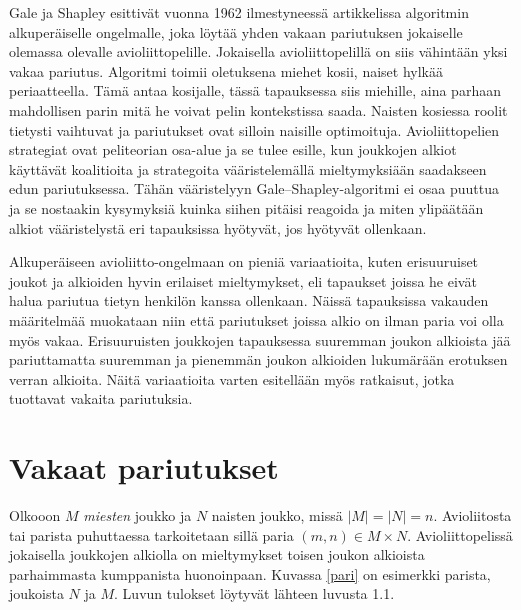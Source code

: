\documentclass[finnish]{tktltiki2}
\theoremstyle{definition}
\theoremstyle{remark}
\begin{document}
Gale ja Shapley esittivät vuonna 1962 ilmestyneessä artikkelissa \cite{gale62a} algoritmin alkuperäiselle ongelmalle, joka löytää yhden vakaan pariutuksen jokaiselle olemassa olevalle avioliittopelille. Jokaisella avioliittopelillä on siis vähintään yksi vakaa pariutus. Algoritmi toimii oletuksena miehet kosii, naiset hylkää periaatteella. Tämä antaa kosijalle, tässä tapauksessa siis miehille, aina parhaan mahdollisen parin mitä he voivat pelin kontekstissa saada. Naisten kosiessa roolit tietysti vaihtuvat ja pariutukset ovat silloin naisille optimoituja.
Avioliittopelien strategiat ovat peliteorian osa-alue ja se tulee esille, kun joukkojen alkiot käyttävät koalitioita ja strategoita vääristelemällä mieltymyksiään saadakseen edun pariutuksessa. Tähän vääristelyyn Gale--Shapley-algoritmi ei osaa puuttua ja se nostaakin kysymyksiä kuinka siihen pitäisi reagoida ja miten ylipäätään alkiot vääristelystä eri tapauksissa hyötyvät, jos hyötyvät ollenkaan.

Alkuperäiseen avioliitto-ongelmaan on pieniä variaatioita, kuten erisuuruiset joukot ja alkioiden hyvin erilaiset mieltymykset, eli tapaukset joissa he eivät halua pariutua tietyn henkilön kanssa ollenkaan. Näissä tapauksissa vakauden määritelmää muokataan niin että pariutukset joissa alkio on ilman paria voi olla myös vakaa. Erisuuruisten joukkojen tapauksessa suuremman joukon alkioista jää pariuttamatta suuremman ja pienemmän joukon alkioiden lukumärään erotuksen verran alkioita. Näitä variaatioita varten esitellään myös ratkaisut, jotka tuottavat vakaita pariutuksia.

\section{Vakaat pariutukset}
Olkooon $M$ \emph{miesten} joukko ja $N$ naisten joukko, missä $|M| = |N| = n$. Avioliitosta tai parista puhuttaessa tarkoitetaan sillä paria $(m, n) \in M \times N$. Avioliittopelissä jokaisella joukkojen alkiolla on mieltymykset toisen joukon alkioista parhaimmasta kumppanista huonoinpaan. Kuvassa \ref{pari} on esimerkki parista, joukoista $N$ ja $M$. Luvun tulokset löytyvät lähteen \cite{gusfield1989stable} luvusta 1.1.
\end{document}
